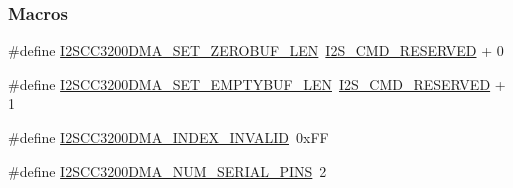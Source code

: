 \subsubsection*{Macros}
\begin{DoxyCompactItemize}
\item 
\#define \hyperlink{_i2_s_c_c3200_d_m_a_8h_a4fc87c0d5ba35cbd7dd5106777df30e9}{I2\+S\+C\+C3200\+D\+M\+A\+\_\+\+S\+E\+T\+\_\+\+Z\+E\+R\+O\+B\+U\+F\+\_\+\+L\+E\+N}~\hyperlink{_i2_s_8h_af919ac4341fca59988c28e16058fa819}{I2\+S\+\_\+\+C\+M\+D\+\_\+\+R\+E\+S\+E\+R\+V\+E\+D} + 0
\item 
\#define \hyperlink{_i2_s_c_c3200_d_m_a_8h_ab263b5ddc1de92899748cb3f641dc0b6}{I2\+S\+C\+C3200\+D\+M\+A\+\_\+\+S\+E\+T\+\_\+\+E\+M\+P\+T\+Y\+B\+U\+F\+\_\+\+L\+E\+N}~\hyperlink{_i2_s_8h_af919ac4341fca59988c28e16058fa819}{I2\+S\+\_\+\+C\+M\+D\+\_\+\+R\+E\+S\+E\+R\+V\+E\+D} + 1
\item 
\#define \hyperlink{_i2_s_c_c3200_d_m_a_8h_a44a9866ba102816db30981347246ae7c}{I2\+S\+C\+C3200\+D\+M\+A\+\_\+\+I\+N\+D\+E\+X\+\_\+\+I\+N\+V\+A\+L\+I\+D}~0x\+F\+F
\item 
\#define \hyperlink{_i2_s_c_c3200_d_m_a_8h_a16c3369e33e69e4d870c2093e4451c03}{I2\+S\+C\+C3200\+D\+M\+A\+\_\+\+N\+U\+M\+\_\+\+S\+E\+R\+I\+A\+L\+\_\+\+P\+I\+N\+S}~2
\end{DoxyCompactItemize}
